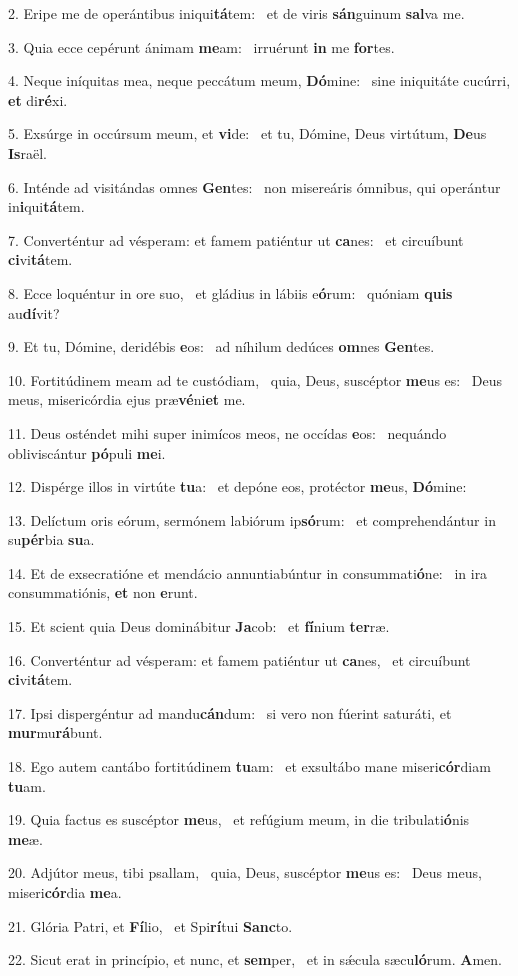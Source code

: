 2. Eripe me de operántibus iniqui\textbf{tá}tem: \ast\  et de viris \textbf{sán}guinum \textbf{sal}va me.\

3. Quia ecce cepérunt ánimam \textbf{me}am: \ast\  irruérunt \textbf{in} me \textbf{for}tes.\

4. Neque iníquitas mea, neque peccátum meum, \textbf{Dó}mine: \ast\  sine iniquitáte cucúrri, \textbf{et} di\textbf{ré}xi.\

5. Exsúrge in occúrsum meum, et \textbf{vi}de: \ast\  et tu, Dómine, Deus virtútum, \textbf{De}us \textbf{Is}raël.\

6. Inténde ad visitándas omnes \textbf{Gen}tes: \ast\  non misereáris ómnibus, qui operántur in\textbf{i}qui\textbf{tá}tem.\

7. Converténtur ad vésperam: et famem patiéntur ut \textbf{ca}nes: \ast\  et circuíbunt \textbf{ci}vi\textbf{tá}tem.\

8. Ecce loquéntur in ore suo, \dag\  et gládius in lábiis e\textbf{ó}rum: \ast\  quóniam \textbf{quis} au\textbf{dí}vit?\

9. Et tu, Dómine, deridébis \textbf{e}os: \ast\  ad níhilum dedúces \textbf{om}nes \textbf{Gen}tes.\

10. Fortitúdinem meam ad te custódiam, \dag\  quia, Deus, suscéptor \textbf{me}us es: \ast\  Deus meus, misericórdia ejus præ\textbf{vé}ni\textbf{et} me.\

11. Deus osténdet mihi super inimícos meos, ne occídas \textbf{e}os: \ast\  nequándo obliviscántur \textbf{pó}puli \textbf{me}i.\

12. Dispérge illos in virtúte \textbf{tu}a: \ast\  et depóne eos, protéctor \textbf{me}us, \textbf{Dó}mine:\

13. Delíctum oris eórum, sermónem labiórum ip\textbf{só}rum: \ast\  et comprehendántur in su\textbf{pér}bia \textbf{su}a.\

14. Et de exsecratióne et mendácio annuntiabúntur in consummati\textbf{ó}ne: \ast\  in ira consummatiónis, \textbf{et} non \textbf{e}runt.\

15. Et scient quia Deus dominábitur \textbf{Ja}cob: \ast\  et \textbf{fí}nium \textbf{ter}ræ.\

16. Converténtur ad vésperam: et famem patiéntur ut \textbf{ca}nes, \ast\  et circuíbunt \textbf{ci}vi\textbf{tá}tem.\

17. Ipsi dispergéntur ad mandu\textbf{cán}dum: \ast\  si vero non fúerint saturáti, et \textbf{mur}mu\textbf{rá}bunt.\

18. Ego autem cantábo fortitúdinem \textbf{tu}am: \ast\  et exsultábo mane miseri\textbf{cór}diam \textbf{tu}am.\

19. Quia factus es suscéptor \textbf{me}us, \ast\  et refúgium meum, in die tribulati\textbf{ó}nis \textbf{me}æ.\

20. Adjútor meus, tibi psallam, \dag\  quia, Deus, suscéptor \textbf{me}us es: \ast\  Deus meus, miseri\textbf{cór}dia \textbf{me}a.\

21. Glória Patri, et \textbf{Fí}lio, \ast\  et Spi\textbf{rí}tui \textbf{Sanc}to.\

22. Sicut erat in princípio, et nunc, et \textbf{sem}per, \ast\  et in sǽcula sæcu\textbf{ló}rum. \textbf{A}men.\

